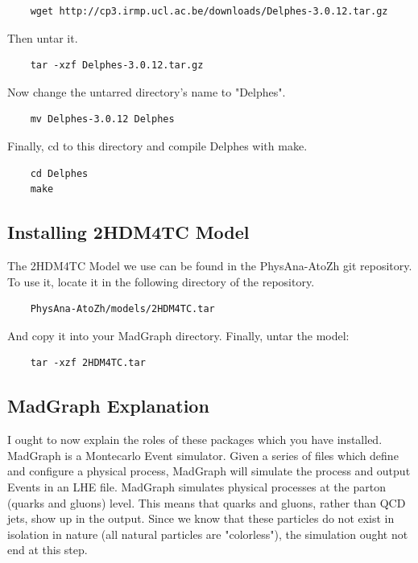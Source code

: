 \documentclass{article}
\begin{document}
\begin{verbatim}
	wget http://cp3.irmp.ucl.ac.be/downloads/Delphes-3.0.12.tar.gz
\end{verbatim}

Then untar it.

\begin{verbatim}
	tar -xzf Delphes-3.0.12.tar.gz
\end{verbatim}

Now change the untarred directory's name to "Delphes".

\begin{verbatim}
	mv Delphes-3.0.12 Delphes
\end{verbatim}

Finally, cd to this directory and compile Delphes with make.

\begin{verbatim}
	cd Delphes
	make
\end{verbatim}

\subsection{Installing 2HDM4TC Model}

The 2HDM4TC Model we use can be found in the PhysAna-AtoZh git repository. To use it,
locate it in the following directory of the repository.

\begin{verbatim}
	PhysAna-AtoZh/models/2HDM4TC.tar
\end{verbatim}

And copy it into your MadGraph directory. Finally, untar the model:

\begin{verbatim}
	tar -xzf 2HDM4TC.tar
\end{verbatim}

\subsection{MadGraph Explanation}

I ought to now explain the roles of these packages which you have installed. MadGraph is a Montecarlo Event simulator.
Given a series of files which define and configure a physical process, MadGraph will simulate the process and output
Events in an LHE file. MadGraph simulates physical processes at the parton (quarks and gluons) level. This means that quarks and gluons,
rather than QCD jets, show up in the output. Since we know that these particles do not exist in isolation in nature
(all natural particles are "colorless"), the simulation ought not end at this step.
\end{document}
